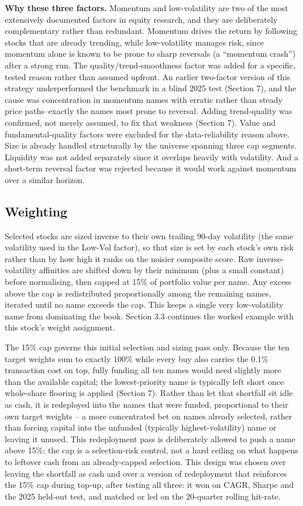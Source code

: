 \documentclass[11pt]{article}
\begin{document}
\textbf{Why these three factors.} Momentum and low-volatility are two of the most extensively documented factors in equity research, and they are deliberately complementary rather than redundant. Momentum drives the return by following stocks that are already trending, while low-volatility manages risk, since momentum alone is known to be prone to sharp reversals (a ``momentum crash'') after a strong run. The quality/trend-smoothness factor was added for a specific, tested reason rather than assumed upfront. An earlier two-factor version of this strategy underperformed the benchmark in a blind 2025 test (Section 7), and the cause was concentration in momentum names with erratic rather than steady price paths--exactly the names most prone to reversal. Adding trend-quality was confirmed, not merely assumed, to fix that weakness (Section 7). Value and fundamental-quality factors were excluded for the data-reliability reason above. Size is already handled structurally by the universe spanning three cap segments. Liquidity was not added separately since it overlaps heavily with volatility. And a short-term reversal factor was rejected because it would work against momentum over a similar horizon.

\subsection{Weighting}
Selected stocks are sized inverse to their own trailing 90-day volatility (the same volatility used in the Low-Vol factor), so that size is set by each stock's own risk rather than by how high it ranks on the noisier composite score. Raw inverse-volatility affinities are shifted down by their minimum (plus a small constant) before normalising, then capped at 15\% of portfolio value per name. Any excess above the cap is redistributed proportionally among the remaining names, iterated until no name exceeds the cap. This keeps a single very low-volatility name from dominating the book. Section 3.3 continues the worked example with this stock's weight assignment.

The 15\% cap governs this initial selection and sizing pass only. Because the ten target weights sum to exactly 100\% while every buy also carries the 0.1\% transaction cost on top, fully funding all ten names would need slightly more than the available capital; the lowest-priority name is typically left short once whole-share flooring is applied (Section 7). Rather than let that shortfall sit idle as cash, it is redeployed into the names that were funded, proportional to their own target weights -- a more concentrated bet on names already selected, rather than forcing capital into the unfunded (typically highest-volatility) name or leaving it unused. This redeployment pass is deliberately allowed to push a name above 15\%: the cap is a selection-risk control, not a hard ceiling on what happens to leftover cash from an already-capped selection. This design was chosen over leaving the shortfall as cash and over a version of redeployment that reinforces the 15\% cap during top-up, after testing all three: it won on CAGR, Sharpe and the 2025 held-out test, and matched or led on the 20-quarter rolling hit-rate.
\end{document}
